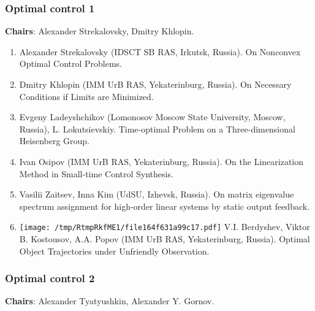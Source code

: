 \documentclass[
]{article}
\providecommand{\tightlist}{%
  \setlength{\itemsep}{0pt}\setlength{\parskip}{0pt}}
\begin{document}
\hypertarget{oc1}{%
\subsubsection{Optimal control 1}\label{oc1}}

\textbf{Chairs}: Alexander Strekalovsky, Dmitry Khlopin.

\begin{enumerate}
\def\labelenumi{\arabic{enumi}.}
\tightlist
\item
  Alexander Strekalovsky (IDSCT SB RAS, Irkutsk, Russia). On Nonconvex
  Optimal Control Problems.
\item
  Dmitry Khlopin (IMM UrB RAS, Yekaterinburg, Russia). On Necessary
  Conditions if Limits are Minimized.
\item
  Evgeny Ladeyshchikov (Lomonosov Moscow State University, Moscow,
  Russia), L. Lokutsievskiy. Time-optimal Problem on a Three-dimensional
  Heisenberg Group.
\item
  Ivan Osipov (IMM UrB RAS, Yekaterinburg, Russia). On the Linearization
  Method in Small-time Control Synthesis.
\item
  Vasilii Zaitsev, Inna Kim (UdSU, Izhevsk, Russia). On matrix
  eigenvalue spectrum assignment for high-order linear systems by static
  output feedback.
\item
  \protect\texttt{[image: /tmp/RtmpRkfME1/file164f631a99c17.pdf]}
  V.I. Berdyshev, Viktor B. Kostousov, A.A. Popov (IMM UrB RAS,
  Yekaterinburg, Russia). Optimal Object Trajectories under Unfriendly
  Observation.
\end{enumerate}

\hypertarget{oc2}{%
\subsubsection{Optimal control 2}\label{oc2}}

\textbf{Chairs}: Alexander Tyatyushkin, Alexander Y. Gornov.
\end{document}
